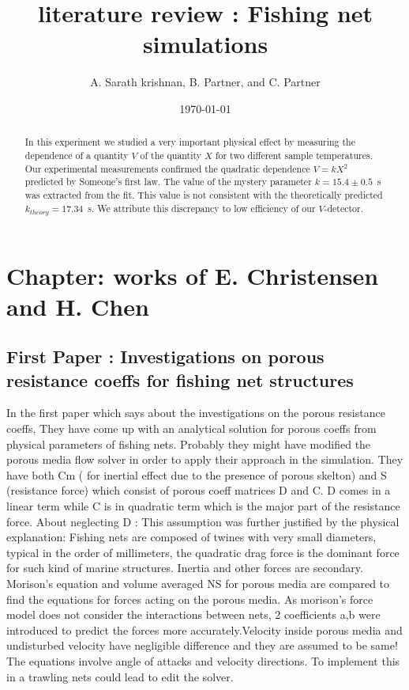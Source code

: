 \documentclass[letterpaper,12pt]{article}
\begin{document}
\title{literature review : Fishing net simulations}
\author{A. Sarath krishnan, B. Partner, and C. Partner}
\date{\today}
\maketitle

\begin{abstract}
In this experiment we studied a very important physical effect by measuring the
dependence of a quantity $V$ of the quantity $X$ for two different sample
temperatures.  Our experimental measurements confirmed the quadratic dependence
$V = kX^2$ predicted by Someone's first law. The value of the mystery parameter
$k = 15.4\pm 0.5$~s was extracted from the fit. This value is
not consistent with the theoretically predicted $k_{theory}=17.34$~s. We attribute this
discrepancy to low efficiency of our $V$-detector.
\end{abstract}

\section{Chapter: works of E. Christensen and H. Chen}

\subsection{First Paper : Investigations on porous resistance coeffs for fishing net structures}

In the first paper which says about the investigations on the porous resistance coeffs, They have come up with an analytical solution for porous coeffs from physical parameters of fishing nets. Probably they might have modified the porous media flow solver in order to apply their approach in the simulation.  They have both Cm ( for inertial effect due to the presence of porous skelton) and S (resistance force) which consist of porous coeff matrices D and C. D comes in a linear term while C is in quadratic term which is the major part of the resistance force.
About neglecting D : This assumption was further justified by the physical explanation: Fishing nets are composed of twines with very small diameters, typical in the order of millimeters, the quadratic drag force is the dominant force for such kind of marine structures. Inertia and other forces are secondary.
Morison's equation and volume averaged NS for porous media are compared to find the equations for forces acting on the porous media. As morison's force model does not consider the interactions between nets, 2 coefficients a,b were introduced to predict the forces more accurately.Velocity inside porous media and undisturbed velocity have negligible difference and they are assumed to be same!
The equations involve angle of attacks and velocity directions. To implement this in a trawling nets could lead to edit the solver.
\end{document}

